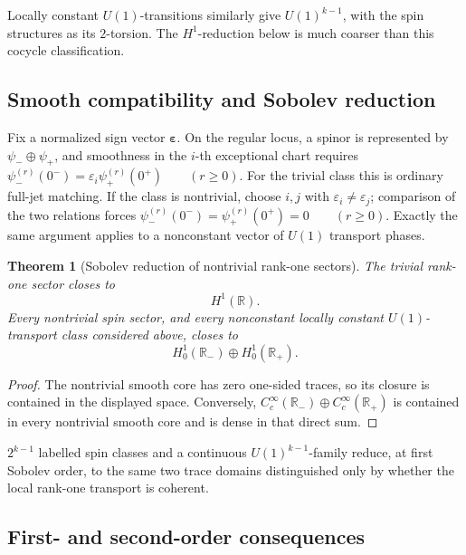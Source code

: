 \documentclass[11pt]{article}
\theoremstyle{plain}
\newtheorem{theorem}{Theorem}[section]
\theoremstyle{definition}
\begin{document}
Locally constant \(U(1)\)-transitions similarly give \(U(1)^{k-1}\), with the spin structures as its \(2\)-torsion. The \(H^1\)-reduction below is much coarser than this cocycle classification.

\subsection{Smooth compatibility and Sobolev reduction}
\label{subsec:Lk-Sobolev-collapse}

Fix a normalized sign vector
\(\boldsymbol{\varepsilon}\). On the regular locus, a spinor is represented
by
\(\psi_-\oplus\psi_+\),
and smoothness in the \(i\)-th exceptional chart requires
\(\psi_-^{(r)}(0^-) = \varepsilon_i\psi_+^{(r)}(0^+) \qquad (r\geq0)\).
For the trivial class this is ordinary full-jet matching. If the class is
nontrivial, choose \(i,j\) with
\(\varepsilon_i\neq\varepsilon_j\); comparison of the two relations forces
\(\psi_-^{(r)}(0^-) = \psi_+^{(r)}(0^+) = 0 \qquad (r\geq0)\).
Exactly the same argument applies to a nonconstant vector of \(U(1)\)
transport phases.

\begin{theorem}[Sobolev reduction of nontrivial rank-one sectors]
\label{thm:Lk-H1-collapse}
The trivial rank-one sector closes to
\[
  H^1(\mathbb R).
\]
Every nontrivial spin sector, and every nonconstant locally constant
\(U(1)\)-transport class considered above, closes to
\[
  H^1_0(\mathbb R_-)
  \oplus
  H^1_0(\mathbb R_+).
\]
\end{theorem}

\begin{proof}
The nontrivial smooth core has zero one-sided traces, so its closure is
contained in the displayed space. Conversely, \(C_c^\infty(\mathbb R_-) \oplus C_c^\infty(\mathbb R_+)\) is contained in every nontrivial smooth core and is dense in that direct
sum.
\end{proof}

\(2^{k-1}\) labelled spin classes and a continuous
\(U(1)^{k-1}\)-family reduce, at first Sobolev order, to the same two trace
domains distinguished only by whether the local rank-one transport is
coherent.

\subsection{First- and second-order consequences}
\label{subsec:Lk-first-order}
\label{subsec:Lk-positive-dynamics}
\end{document}
